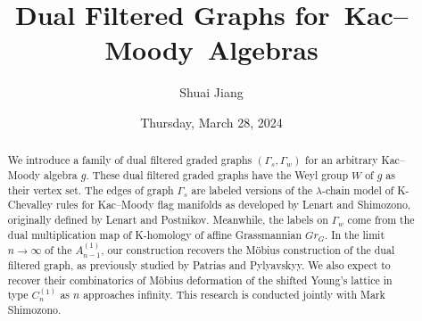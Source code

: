 \documentclass{UAmathtalk}
\author{Shuai Jiang}
\title{Dual Filtered Graphs for~Kac–Moody~Algebras}
\date{Thursday, March 28, 2024}
\begin{document}
\maketitle

\begin{abstract}
We introduce a family of dual filtered graded graphs $(\Gamma_s, \Gamma_w)$ for an arbitrary Kac–Moody algebra $g$. These dual filtered graded graphs have the Weyl group $W$ of $g$ as their vertex set. The edges of graph $\Gamma_s$ are labeled versions of the $\lambda$-chain model of K-Chevalley rules for Kac–Moody flag manifolds as developed by Lenart and Shimozono, originally defined by Lenart and Postnikov. Meanwhile, the labels on $\Gamma_w$ come from the dual multiplication map of K-homology of affine Grassmannian $Gr_G$. In the limit $n\rightarrow \infty$ of the $A^{(1)}_{n-1}$, our construction recovers the Möbius construction of the dual filtered graph, as previously studied by Patrias and Pylyavskyy. We also expect to recover their combinatorics of Möbius deformation of the shifted Young’s lattice in type $C^{(1)}_n$ as $n$ approaches infinity. This research is conducted jointly with Mark Shimozono.
\end{abstract}
\end{document}
